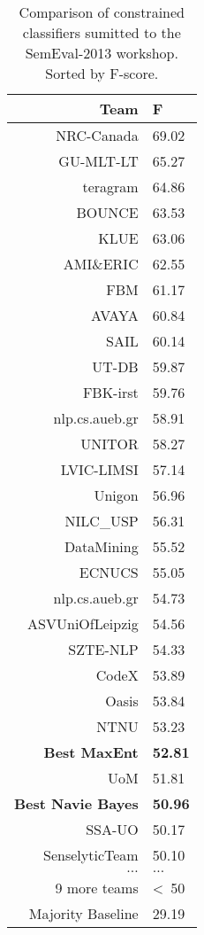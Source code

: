 \documentclass[12pt]{article}
\begin{document}
\begin{table}[H]
    \begin{center}
    \begin{tabular}{|r|l|}
        \hline
        Team       & F \\
        \hline
        NRC-Canada & 69.02 \\
        GU-MLT-LT  & 65.27 \\
        teragram   & 64.86 \\
        BOUNCE     & 63.53 \\
        KLUE       & 63.06 \\
        AMI\&ERIC  & 62.55 \\
        FBM        & 61.17 \\
        AVAYA      & 60.84 \\
        SAIL       & 60.14 \\
        UT-DB      & 59.87 \\
        FBK-irst   & 59.76 \\
        nlp.cs.aueb.gr & 58.91 \\
        UNITOR     & 58.27 \\
        LVIC-LIMSI & 57.14 \\
        Unigon     & 56.96 \\
        NILC\_USP  & 56.31 \\
        DataMining & 55.52 \\
        ECNUCS     & 55.05 \\
        nlp.cs.aueb.gr & 54.73 \\
        ASVUniOfLeipzig & 54.56 \\
        SZTE-NLP   & 54.33 \\
        CodeX      & 53.89 \\
        Oasis      & 53.84 \\
        NTNU       & 53.23 \\
        \textbf{Best MaxEnt}& \textbf{52.81} \\
        UoM        & 51.81 \\
        \textbf{Best Navie Bayes}& \textbf{50.96} \\
        SSA-UO     & 50.17 \\
        SenselyticTeam & 50.10 \\
        $\ldots$   & $\ldots$ \\
        9 more teams &  \textless\ 50 \\
        \hline
        Majority Baseline & 29.19 \\
        \hline
    \end{tabular}
    \end{center}
    \caption{Comparison of constrained classifiers sumitted to the SemEval-2013
        workshop. Sorted by F-score.}
    \label{table:comparison}
\end{table}
\end{document}
